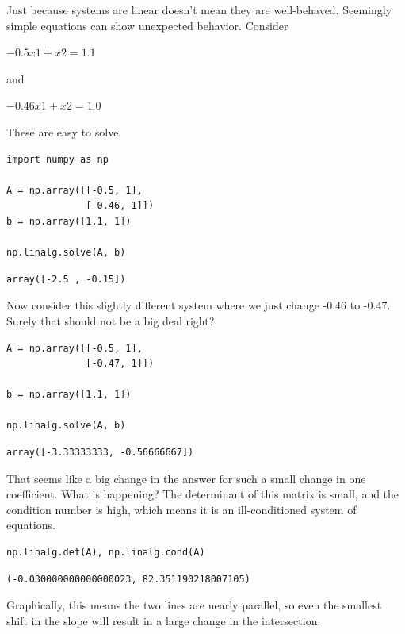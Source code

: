 \documentclass[11pt]{article}
\begin{document}
Just because systems are linear doesn't mean they are well-behaved. Seemingly simple equations can show unexpected behavior. Consider

\(-0.5 x1 + x2 = 1.1\)

and

\(-0.46 x1 + x2 = 1.0\)

These are easy to solve.

\begin{verbatim}
import numpy as np

A = np.array([[-0.5, 1],
              [-0.46, 1]])
b = np.array([1.1, 1])

np.linalg.solve(A, b)
\end{verbatim}

\begin{verbatim}
array([-2.5 , -0.15])
\end{verbatim}

Now consider this slightly different system where we just change -0.46 to -0.47. Surely that should not be a big deal right?

\begin{verbatim}
A = np.array([[-0.5, 1],
              [-0.47, 1]])

b = np.array([1.1, 1])

np.linalg.solve(A, b)
\end{verbatim}

\begin{verbatim}
array([-3.33333333, -0.56666667])
\end{verbatim}

That seems like a big change in the answer for such a small change in one coefficient. What is happening? The determinant of this matrix is small, and the condition number is high, which means it is an ill-conditioned system of equations.

\begin{verbatim}
np.linalg.det(A), np.linalg.cond(A)
\end{verbatim}

\begin{verbatim}
(-0.030000000000000023, 82.351190218007105)
\end{verbatim}

Graphically, this means the two lines are nearly parallel, so even the smallest shift in the slope will result in a large change in the intersection.
\end{document}
